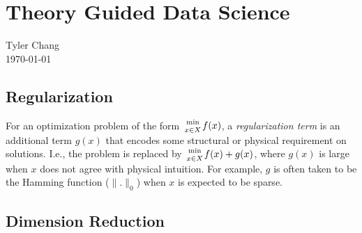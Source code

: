 \documentclass[12pt]{article}
\begin{document}
\section*{Theory Guided Data Science}
Tyler Chang\\
\today

\subsection*{Regularization}

For an optimization problem of the form ${\min \atop x\in X} f(x)$, a
{\it regularization term} is an additional term $g(x)$ that encodes some
structural or physical requirement on solutions.
I.e., the problem is replaced by ${\min \atop x\in X} f(x) + g(x)$, where
$g(x)$ is large when $x$ does not agree with physical intuition.
For example, $g$ is often taken to be the Hamming function ($\|.\|_0$)
when $x$ is expected to be sparse.

\subsection*{Dimension Reduction}
\end{document}
